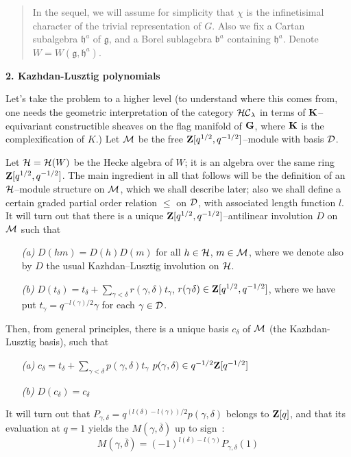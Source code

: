 \documentclass[11 pt]{article}
\def\ds{\displaystyle}
\def\ov{\overline}
\def\b{{\mathfrak b}}
\def\D{{\cal D}}
\def\d{\delta}
\def\G{{\bf G}}
\def\g{\gamma}
\def\gf{{\mathfrak g}}
\def\HC{{\cal HC}}
\def\Hc{{\cal H}}
\def\hf{{\mathfrak h}}
\def\K{{\bf K}}
\def\l{\lambda}
\def\M{{\cal M}}
\def\Z{{\bf Z}}
\def\Zq{\Z[q^{1/2},q^{-1/2}]}
\begin{document}
\medskip

\begin{quote}\noindent
In the sequel, we will assume for simplicity that $\chi$ is the 
infinetisimal character of the trivial representation of $G$. Also we fix a 
Cartan
subalgebra $\hf^a$ of $\gf$, and a Borel sublagebra $\b^a$ containing $\hf^a$. 
Denote $W=W(\gf,\hf^a)$.
\end{quote}

\vfill\eject

\noindent\textbf{2. Kazhdan-Lusztig polynomials}

\medskip

Let's take the problem to a higher level (to understand where this comes from,
one needs the geometric interpretation of the category $\HC_\l$ in terms of 
$\K$--equivariant constructible sheaves on the flag manifold of $\G$, where 
$\K$ is the complexification of $K$.) Let $\M$ be the free $\Zq$--module with
basis $\D$.

Let $\Hc=\Hc(W)$ be the Hecke algebra of $W$; it is an algebra over the
same ring $\Zq$. The main ingredient in all that follows will be the
definition of an $\Hc$--module structure on $\M$, which we shall describe
later; also we shall define a certain graded partial order relation $\leq$ on 
$\D$, with associated length function $l$. It will turn out that there is a 
unique $\Zq$--antilinear involution $D$ on $\M$ such that

\begin{itemize}
\item[\it(a)]$D(hm)=D(h)D(m)$ for all $h\in\Hc$, $m\in\M$, where we denote
also by $D$ the usual Kazhdan--Lusztig involution on $\Hc$.
\item[\it(b)]$D(t_\d)=t_\d+\sum_{\g<\d}r(\g,\d)t_\g$, $r(\g\d)\in\Zq$, where 
we have put $t_\g=q^{-l(\g)/2}\g$ for each $\g\in\D$.
\end{itemize}

Then, from general principles, there is a unique basis $c_\d$ of $\M$ (the 
Kazhdan-Lusztig basis), such that

\begin{itemize}
\item[\it(a)]$\ds{c_\d=t_\d+\sum_{\g<\d}p(\g,\d)t_\g}$\hspace{.5cm}
$p(\g,\d)\in q^{-1/2}\Z[q^{-1/2}]$
\item[\it(b)]$D(c_\d)=c_\d$
\end{itemize}

It will turn out that $P_{\g,\d}=q^{(l(\d)-l(\g))/2}p(\g,\d)$ belongs to
$\Z[q]$, and that its evaluation at $q=1$ yields the $M(\g,\ov\d)$ up to sign~:
$$
M(\g,\ov\d)=(-1)^{l(\d)-l(\g)}P_{\g,\d}(1)
$$
\end{document}
